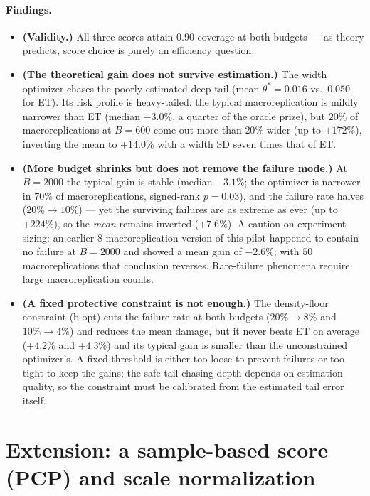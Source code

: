 \documentclass[11pt]{article}
\begin{document}
\paragraph{Findings.}
\begin{itemize}
  \item[\textbf{F1}] \textbf{(Validity.)} All three scores attain $0.90$
  coverage at both budgets --- as theory predicts, score choice is purely an
  efficiency question.
  \item[\textbf{F2}] \textbf{(The theoretical gain does not survive
  estimation.)} The width optimizer chases the poorly estimated deep tail
  (mean $\theta^{*} = 0.016$ vs.\ $0.050$ for ET). Its risk profile is
  heavy-tailed: the typical macroreplication is mildly narrower than ET
  (median $-3.0\%$, a quarter of the oracle prize), but $20\%$ of
  macroreplications at $B = 600$ come out more than $20\%$ wider (up to
  $+172\%$), inverting the mean to $+14.0\%$ with a width SD seven times
  that of ET.
  \item[\textbf{F3}] \textbf{(More budget shrinks but does not remove the
  failure mode.)} At $B = 2000$ the typical gain is stable (median
  $-3.1\%$; the optimizer is narrower in $70\%$ of macroreplications,
  signed-rank $p = 0.03$), and the failure rate halves ($20\% \to 10\%$) ---
  yet the surviving failures are as extreme as ever (up to $+224\%$), so the
  \emph{mean} remains inverted ($+7.6\%$). A caution on experiment sizing:
  an earlier $8$-macroreplication version of this pilot happened to contain
  no failure at $B = 2000$ and showed a mean gain of $-2.6\%$; with $50$
  macroreplications that conclusion reverses. Rare-failure phenomena require
  large macroreplication counts.
  \item[\textbf{F4}] \textbf{(A fixed protective constraint is not enough.)}
  The density-floor constraint (b-opt) cuts the failure rate at both budgets
  ($20\% \to 8\%$ and $10\% \to 4\%$) and reduces the mean damage, but it
  never beats ET on average ($+4.2\%$ and $+4.3\%$) and its typical gain is
  smaller than the unconstrained optimizer's. A fixed threshold is either
  too loose to prevent failures or too tight to keep the gains; the safe
  tail-chasing depth depends on estimation quality, so the constraint must
  be calibrated from the estimated tail error itself.
\end{itemize}

\section{Extension: a sample-based score (PCP) and scale normalization}
\end{document}
